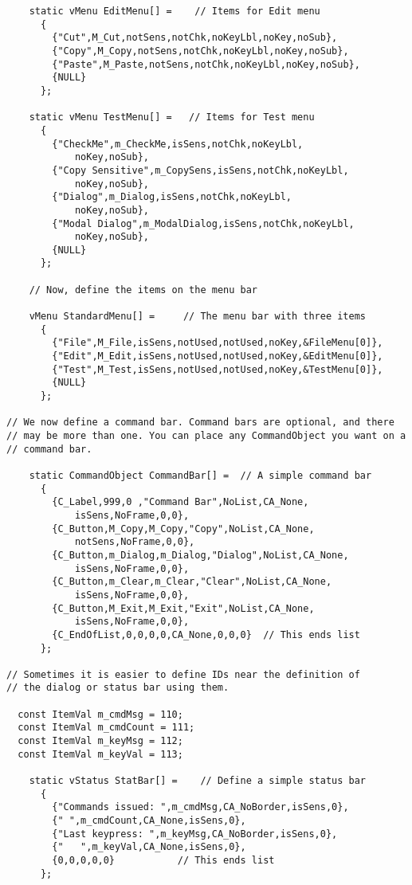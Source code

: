\begin{verbatim}
    static vMenu EditMenu[] =    // Items for Edit menu
      {
        {"Cut",M_Cut,notSens,notChk,noKeyLbl,noKey,noSub},
        {"Copy",M_Copy,notSens,notChk,noKeyLbl,noKey,noSub},
        {"Paste",M_Paste,notSens,notChk,noKeyLbl,noKey,noSub},
        {NULL}
      };

    static vMenu TestMenu[] =   // Items for Test menu
      {
        {"CheckMe",m_CheckMe,isSens,notChk,noKeyLbl,
            noKey,noSub},
        {"Copy Sensitive",m_CopySens,isSens,notChk,noKeyLbl,
            noKey,noSub},
        {"Dialog",m_Dialog,isSens,notChk,noKeyLbl,
            noKey,noSub},
        {"Modal Dialog",m_ModalDialog,isSens,notChk,noKeyLbl,
            noKey,noSub},
        {NULL}
      };

    // Now, define the items on the menu bar

    vMenu StandardMenu[] =     // The menu bar with three items
      {
        {"File",M_File,isSens,notUsed,notUsed,noKey,&FileMenu[0]},
        {"Edit",M_Edit,isSens,notUsed,notUsed,noKey,&EditMenu[0]},
        {"Test",M_Test,isSens,notUsed,notUsed,noKey,&TestMenu[0]},
        {NULL}
      };

// We now define a command bar. Command bars are optional, and there
// may be more than one. You can place any CommandObject you want on a
// command bar.

    static CommandObject CommandBar[] =  // A simple command bar
      {
        {C_Label,999,0 ,"Command Bar",NoList,CA_None,
            isSens,NoFrame,0,0},
        {C_Button,M_Copy,M_Copy,"Copy",NoList,CA_None,
            notSens,NoFrame,0,0},
        {C_Button,m_Dialog,m_Dialog,"Dialog",NoList,CA_None,
            isSens,NoFrame,0,0},
        {C_Button,m_Clear,m_Clear,"Clear",NoList,CA_None,
            isSens,NoFrame,0,0},
        {C_Button,M_Exit,M_Exit,"Exit",NoList,CA_None,
            isSens,NoFrame,0,0},
        {C_EndOfList,0,0,0,0,CA_None,0,0,0}  // This ends list
      };

// Sometimes it is easier to define IDs near the definition of
// the dialog or status bar using them.

  const ItemVal m_cmdMsg = 110;
  const ItemVal m_cmdCount = 111;
  const ItemVal m_keyMsg = 112;
  const ItemVal m_keyVal = 113;

    static vStatus StatBar[] =    // Define a simple status bar
      {
        {"Commands issued: ",m_cmdMsg,CA_NoBorder,isSens,0},
        {" ",m_cmdCount,CA_None,isSens,0},
        {"Last keypress: ",m_keyMsg,CA_NoBorder,isSens,0},
        {"   ",m_keyVal,CA_None,isSens,0},
        {0,0,0,0,0}           // This ends list
      };


\end{verbatim}
